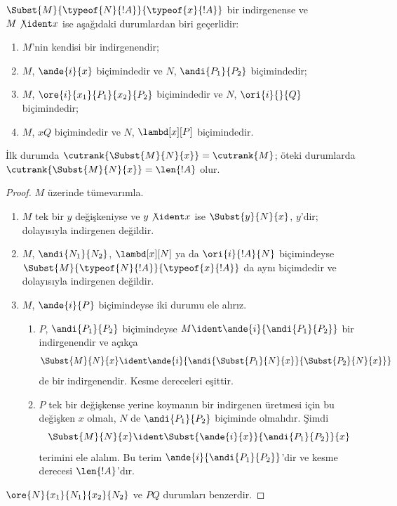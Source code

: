 \begin{lem}
  $\Subst{M}{\typeof{N}{!A}}{\typeof{x}{!A}}$ bir indirgenense ve $M
  \not\ident x$ ise aşağıdaki durumlardan biri geçerlidir:
  \begin{enumerate}
  \item $M$'nin kendisi bir indirgenendir;
  \item $M$, $\ande{i}{x}$ biçimindedir ve $N$, $\andi{P_1}{P_2}$
    biçimindedir;
  \item $M$, $\ore{i}{x_1}{P_1}{x_2}{P_2}$ biçimindedir ve $N$,
    $\ori{i}{}{Q}$ biçimindedir;
  \item $M$, $x Q$ biçimindedir ve $N$, $\lambd[x][P]$ biçimindedir.
  \end{enumerate}
  İlk durumda $\cutrank{\Subst{M}{N}{x}} = \cutrank{M}$; öteki
  durumlarda $\cutrank{\Subst{M}{N}{x}} = \len{!A}$ olur.
\end{lem}
\begin{proof}
  $M$ üzerinde tümevarımla.
  \begin{enumerate}
  \item $M$ tek bir $y$ değişkeniyse ve $y \not\ident x$ ise
    $\Subst{y}{N}{x}$, $y$'dir; dolayısıyla indirgenen değildir.
  \item $M$, $\andi{N_1}{N_2}$, $\lambd[x][N]$ ya da
    $\ori{i}{!A}{N}$ biçimindeyse
    $\Subst{M}{\typeof{N}{!A}}{\typeof{x}{!A}}$ da aynı biçimdedir ve
    dolayısıyla indirgenen değildir.
  \item $M$, $\ande{i}{P}$ biçimindeyse iki durumu ele alırız.
    \begin{enumerate}
      \item $P$, $\andi{P_1}{P_2}$ biçimindeyse $M \ident
        \ande{i}{\andi{P_1}{P_2}}$ bir indirgenendir ve açıkça
        \[
        \Subst{M}{N}{x} \ident
        \ande{i}{\andi{\Subst{P_1}{N}{x}}{\Subst{P_2}{N}{x}}}
        \]
        de bir indirgenendir. Kesme dereceleri eşittir.
      \item $P$ tek bir değişkense yerine koymanın bir indirgenen üretmesi
        için bu değişken $x$ olmalı, $N$ de $\andi{P_1}{P_2}$ biçiminde
        olmalıdır. Şimdi
        \[
        \Subst{M}{N}{x} \ident \Subst{\ande{i}{x}}{\andi{P_1}{P_2}}{x}
        \]
        terimini ele alalım. Bu terim
        $\ande{i}{\andi{P_1}{P_2}}$'dir ve kesme derecesi
        $\len{!A}$'dır.
    \end{enumerate}
  \end{enumerate}
  $\ore{N}{x_1}{N_1}{x_2}{N_2}$ ve $P Q$ durumları benzerdir.
\end{proof}

